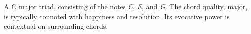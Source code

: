 A C major triad, consisting of the notes \textit{C}, \textit{E}, and \textit{G}. The chord quality, major, is typically connoted with happiness and resolution. Its evocative power is contextual on surrounding chords.